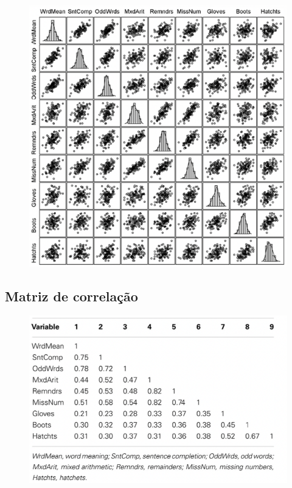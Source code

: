 \documentclass[
  letterpaper,
  DIV=11,
  numbers=noendperiod]{scrartcl}
\begin{document}
\begin{figure}

{\centering \includegraphics{figs/Aula07/ex2.png}

}

\end{figure}

\hypertarget{matriz-de-correlauxe7uxe3o}{%
\subsection{Matriz de correlação}\label{matriz-de-correlauxe7uxe3o}}

\begin{figure}

{\centering \includegraphics{figs/Aula07/Mcorr.png}

}

\end{figure}
\end{document}
